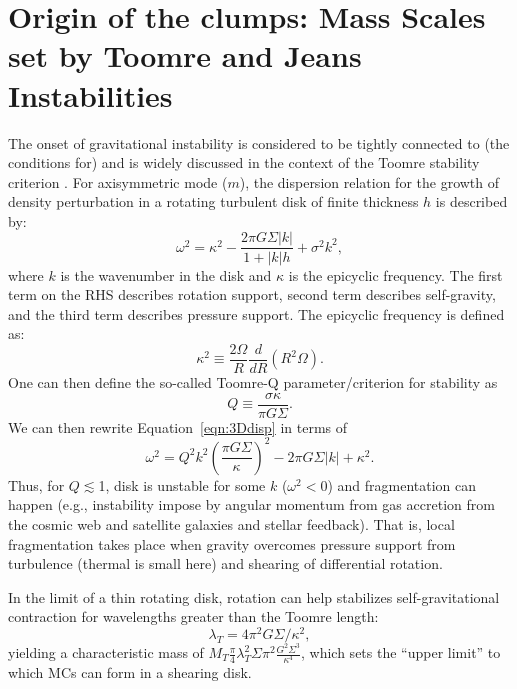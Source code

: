 \documentclass[iop]{emulateapj} %
\begin{document}
\section{Origin of the clumps: Mass Scales set by Toomre and Jeans Instabilities}   \label{sec:Q}
The onset of gravitational instability is considered to be tightly connected to (the conditions for) \SF \citep[e.g.,][]{Kennicutt89a, Li05b, Li06a}
and is widely discussed in the context of the Toomre stability criterion \citep{Toomre64a, Goldreich65b}.
For axisymmetric mode ($m$), the dispersion relation for the growth of density perturbation in a rotating turbulent disk
of finite thickness $h$
is described by:
\begin{equation}
\omega^2 = \kappa^2 - \frac{2\pi G \Sigma |k|}{1 + |k| h} + \sigma^2 k^2,
\label{eqn:3Ddisp}
\end{equation}
where $k$ is the wavenumber in the disk and $\kappa$ is the epicyclic frequency.
The first term on the RHS describes rotation support, second term describes self-gravity, and
the third term describes pressure support.
The epicyclic frequency is defined as:
\begin{equation}
\kappa^2\equiv\frac{2\Omega}{R}\frac{d}{dR}\left(R^2\Omega\right).
\label{eqn:kappa}
\end{equation}
One can then define the so-called Toomre-Q parameter/criterion for stability as
\begin{equation}
Q\equiv\frac{\sigma\kappa}{\pi G \Sigma}.
\label{eqn:Q}
\end{equation}
We can then rewrite Equation~\ref{eqn:3Ddisp} in terms of
\begin{equation}
\omega^2 = Q^2 k^2 \left(\frac{\pi G \Sigma}{\kappa}\right)^2 - 2\pi G \Sigma |k| + \kappa^2.
\end{equation}
Thus, for $Q\lesssim$1, disk is unstable for some $k$ ($\omega^2 < 0$)
and fragmentation can happen
(e.g., instability impose by angular momentum from gas accretion from the cosmic web and
satellite galaxies and stellar feedback).
That is, local fragmentation takes place when gravity overcomes pressure support
from turbulence (thermal is small here) and shearing of differential rotation.

In the limit of a thin rotating disk, rotation can help stabilizes
self-gravitational contraction for wavelengths greater than the Toomre length:
\begin{equation}
\lambda_T = 4\pi^2 G\Sigma/\kappa^2,
\end{equation}
yielding a characteristic mass of $M_T$\eq$\frac{\pi}{4}{\lambda_T^2}{\Sigma}$$\pi^2\frac{G^2\Sigma^3}{\kappa^4}$,
which sets the ``upper limit'' to which MCs can form in a shearing disk.
\end{document}
